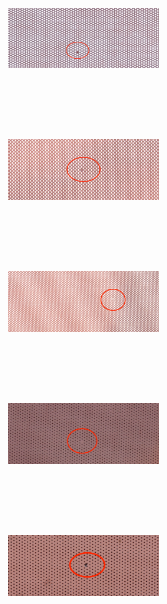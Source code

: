 \begin{figure}[!htbp]
    \centering
    \begin{subfigure}[b]{0.29\textwidth}
        \includegraphics[width=4cm, height=3cm]{figures/GEM/figures/3a.jpg}
        \caption{ }
        \label{fig:O_4a}
    \end{subfigure}
    \begin{subfigure}[b]{0.29\textwidth}
        \includegraphics[width=4cm, height=3cm]{figures/GEM/figures/3b.jpg}
        \caption{ }
        \label{fig:O_4b}
    \end{subfigure}
    \centering
    \begin{subfigure}[b]{0.29\textwidth}
        \includegraphics[width=4cm, height=3cm]{figures/GEM/figures/3c.jpg}
        \caption{ }
        \label{fig:O_4c}
    \end{subfigure}
    \centering
    \begin{subfigure}[b]{0.29\textwidth}
        \includegraphics[width=4cm, height=3cm]{figures/GEM/figures/3d.jpg}
        \caption{ }
        \label{fig:O_5a}
    \end{subfigure}
    \centering
    \begin{subfigure}[b]{0.29\textwidth}
        \includegraphics[width=4cm, height=3cm]{figures/GEM/figures/3e.jpg}

\end{subfigure}
\end{figure}

